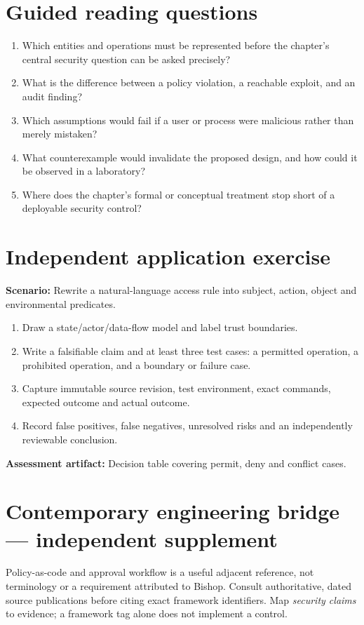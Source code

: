 \documentclass[10pt,letterpaper]{article}
\begin{document}
\section{Guided reading questions}
\begin{enumerate}
\item Which entities and operations must be represented before the chapter's central security question can be asked precisely?
\item What is the difference between a policy violation, a reachable exploit, and an audit finding?
\item Which assumptions would fail if a user or process were malicious rather than merely mistaken?
\item What counterexample would invalidate the proposed design, and how could it be observed in a laboratory?
\item Where does the chapter's formal or conceptual treatment stop short of a deployable security control?
\end{enumerate}
\section{Independent application exercise}
\textbf{Scenario:} Rewrite a natural-language access rule into subject, action, object and environmental predicates.
\begin{enumerate}
\item Draw a state/actor/data-flow model and label trust boundaries.
\item Write a falsifiable claim and at least three test cases: a permitted operation, a prohibited operation, and a boundary or failure case.
\item Capture immutable source revision, test environment, exact commands, expected outcome and actual outcome.
\item Record false positives, false negatives, unresolved risks and an independently reviewable conclusion.
\end{enumerate}
\textbf{Assessment artifact:} Decision table covering permit, deny and conflict cases.
\section{Contemporary engineering bridge --- independent supplement}
Policy-as-code and approval workflow is a useful adjacent reference, not terminology or a requirement attributed to Bishop. Consult authoritative, dated source publications before citing exact framework identifiers. Map \emph{security claims} to evidence; a framework tag alone does not implement a control.
\end{document}
